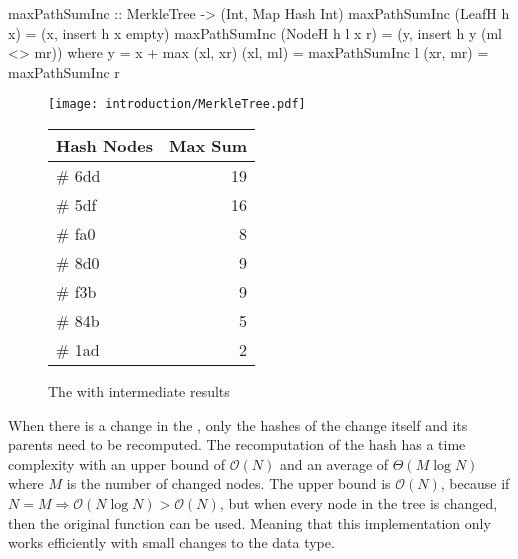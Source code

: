 \begin{haskell}
maxPathSumInc :: MerkleTree -> (Int, Map Hash Int)    
maxPathSumInc (LeafH h x)     = (x, insert h x empty)
maxPathSumInc (NodeH h l x r) = (y, insert h y (ml <> mr))  
  where
    y = x + max (xl, xr)
    (xl, ml) = maxPathSumInc l
    (xr, mr) = maxPathSumInc r
\end{haskell}
\vspace{15pt}
\begin{figure}[H]
    \begin{minipage}[c]{0.55\textwidth}
        \centering
        \texttt{[image: introduction/MerkleTree.pdf]}
    \end{minipage}
    \hspace{0.1\textwidth}
    \begin{minipage}[c]{0.35\textwidth}
        \centering
        \begin{tabular}{|l|r|}
            \hline
            \textbf{Hash Nodes} & \textbf{Max Sum} \\
            \hline
            \# 6dd & 19 \\
            \hline
            \# 5df & 16 \\
            \hline
            \# fa0 & 8 \\
            \hline
            \# 8d0 & 9 \\
            \hline
            \# f3b & 9 \\
            \hline
            \# 84b & 5 \\
            \hline
            \# 1ad & 2 \\
            \hline
        \end{tabular}
    \end{minipage}
    \caption{The  with intermediate results}    
\end{figure}

When there is a change in the , only the hashes of the change itself and its parents need to be recomputed. The recomputation of the hash has a time complexity with an upper bound of $\mathcal{O}(N)$ and an average of $\Theta(M \log{N})$ where $M$ is the number of changed nodes. The upper bound is $\mathcal{O}(N)$, because if $N = M \Rightarrow \mathcal{O}(N \log{N}) > \mathcal{O}(N)$, but when every node in the tree is changed, then the original function can be used. Meaning that this implementation only works efficiently with small changes to the data type.

